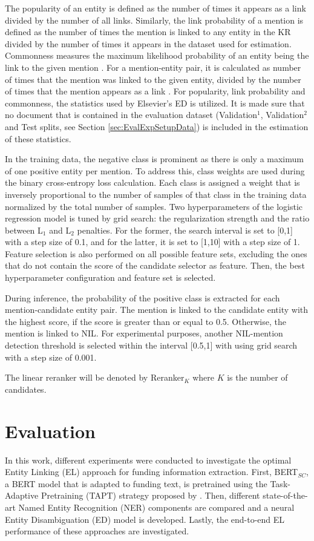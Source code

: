 \documentclass{report}
\theoremstyle{definition}
\theoremstyle{remark}
\begin{document}
The popularity of an entity is defined as the number of times it appears as a link divided by the number of all links. Similarly, the link probability \cite{balog} of a mention is defined as the number of times the mention is linked to any entity in the KR divided by the number of times it appears in the dataset used for estimation. Commonness measures the maximum likelihood probability of an entity being the link to the given mention \cite{balog}. For a mention-entity pair, it is calculated as number of times that the mention was linked to the given entity, divided by the number of times that the mention appears as a link \cite{balog}. For popularity, link probability and commonness, the statistics used by Elsevier's ED is utilized. It is made sure that no document that is contained in the evaluation dataset (Validation$^1$, Validation$^2$ and Test splits, see Section \ref{sec:EvalExpSetupData}) is included in the estimation of these statistics.

In the training data, the negative class is prominent as there is only a maximum of one positive entity per mention. To address this, class weights are used during the binary cross-entropy loss calculation. Each class is assigned a weight that is inversely proportional to the number of samples of that class in the training data normalized by the total number of samples. Two hyperparameters of the logistic regression model is tuned by grid search: the regularization strength and the ratio between L$_1$ and L$_2$ penalties. For the former, the search interval is set to [0,1] with a step size of 0.1, and for the latter, it is set to [1,10] with a step size of 1. Feature selection is also performed on all possible feature sets, excluding the ones that do not contain the score of the candidate selector as feature. Then, the best hyperparameter configuration and feature set is selected.

During inference, the probability of the positive class is extracted for each mention-candidate entity pair. The mention is linked to the candidate entity with the highest score, if the score is greater than or equal to 0.5. Otherwise, the mention is linked to NIL. For experimental purposes, another NIL-mention detection threshold is selected within the interval [0.5,1] with using grid search with a step size of 0.001. 

The linear reranker will be denoted by Reranker$_K$ where $K$ is the number of candidates.



\newpage
\chapter{Evaluation}
\label{sec:Evaluation}
In this work, different experiments were conducted to investigate the optimal Entity Linking (EL) approach for funding information extraction. First, BERT$_{SC}$, a BERT model that is adapted to funding text, is pretrained using the Task-Adaptive Pretraining (TAPT) strategy proposed by \cite{DontStop}. Then, different state-of-the-art Named Entity Recognition (NER) components are compared and a neural Entity Disambiguation (ED) model is developed. Lastly, the end-to-end EL performance of these approaches are investigated.
\end{document}

